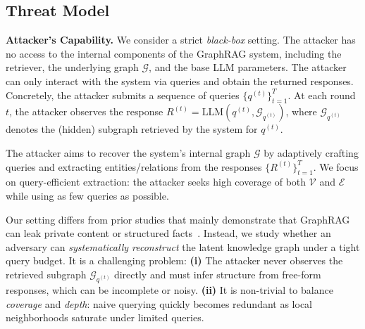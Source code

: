\subsection{Threat Model} \label{sec:threat_model}

{\bf Attacker's Capability.}  We consider a strict \textit{black-box} setting. The attacker has no access to the internal components of the GraphRAG system, including the retriever, the underlying graph $\mathcal{G}$, and the base LLM parameters. The attacker can only interact with the system via queries and obtain the returned responses. Concretely, the attacker submits a sequence of queries $\{q^{(t)}\}_{t=1}^T$. At each round $t$, the attacker observes the response $
R^{(t)} = \mathrm{LLM}(q^{(t)}, \mathcal{G}_{q^{(t)}})$, 
where $\mathcal{G}_{q^{(t)}}$ denotes the (hidden) subgraph retrieved by the system for $q^{(t)}$.

 The attacker aims to recover the system's internal graph $\mathcal{G}$ by adaptively crafting queries and extracting entities/relations from the responses $\{R^{(t)}\}_{t=1}^T$. We focus on query-efficient extraction: the attacker seeks high coverage of both $\mathcal{V}$ and $\mathcal{E}$ while using as few queries as possible.

 Our setting differs from prior studies that mainly demonstrate that GraphRAG can leak private content or structured facts~\cite{liu2025exposing}. Instead, we study whether an adversary can \emph{systematically reconstruct} the latent knowledge graph under a tight query budget. It is a challenging problem:  
\textbf{(i)} The attacker never observes the retrieved subgraph $\mathcal{G}_{q^{(t)}}$ directly and must infer structure from free-form responses, which can be incomplete or noisy. 
\textbf{(ii)} It is non-trivial to balance \emph{coverage} and \emph{depth}: naive querying quickly becomes redundant as local neighborhoods saturate under limited queries. 



 